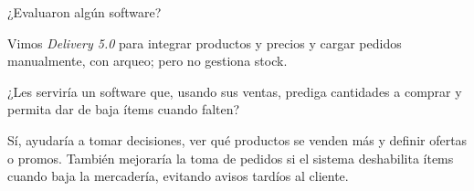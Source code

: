 \begin{description}[leftmargin=0cm, labelsep=0.5cm]
  \item[\textbf{Entrevistador:}] ¿Evaluaron algún software?

  \item[\textbf{Oscar Campione:}] Vimos \textit{Delivery 5.0} para integrar productos y precios y cargar pedidos manualmente, con arqueo; pero no gestiona stock.

  \item[\textbf{Entrevistador:}] ¿Les serviría un software que, usando sus ventas, prediga cantidades a comprar y permita dar de baja ítems cuando falten?

  \item[\textbf{Oscar Campione:}] Sí, ayudaría a tomar decisiones, ver qué productos se venden más y definir ofertas o promos. También mejoraría la toma de pedidos si el sistema deshabilita ítems cuando baja la mercadería, evitando avisos tardíos al cliente.

\end{description}
